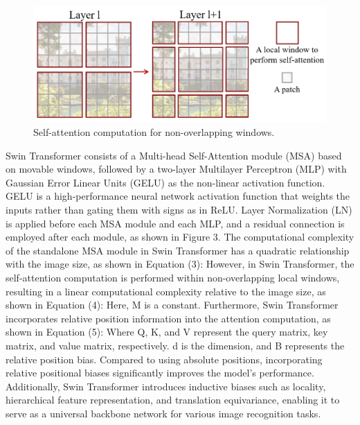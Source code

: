 \documentclass[10pt,twocolumn,letterpaper]{article}
\begin{document}
\begin{figure}
  \begin{center}
  \includegraphics{Images/ST_1.png}
  \end{center}
     \caption{Self-attention computation for non-overlapping windows.}
  \label{fig:st_1}
\end{figure}

Swin Transformer consists of a Multi-head Self-Attention module (MSA) based on movable windows, followed by a two-layer Multilayer Perceptron (MLP) with Gaussian Error Linear Units (GELU) as the non-linear activation function. GELU is a high-performance neural network activation function that weights the inputs rather than gating them with signs as in ReLU. Layer Normalization (LN) is applied before each MSA module and each MLP, and a residual connection is employed after each module, as shown in Figure 3.
The computational complexity of the standalone MSA module in Swin Transformer has a quadratic relationship with the image size, as shown in Equation (3):
However, in Swin Transformer, the self-attention computation is performed within non-overlapping local windows, resulting in a linear computational complexity relative to the image size, as shown in Equation (4):
Here, M is a constant.
Furthermore, Swin Transformer incorporates relative position information into the attention computation, as shown in Equation (5):
Where Q, K, and V represent the query matrix, key matrix, and value matrix, respectively. d is the dimension, and B represents the relative position bias. Compared to using absolute positions, incorporating relative positional biases significantly improves the model's performance.
Additionally, Swin Transformer introduces inductive biases such as locality, hierarchical feature representation, and translation equivariance, enabling it to serve as a universal backbone network for various image recognition tasks.
\end{document}
